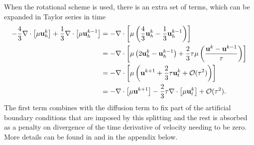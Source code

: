 \documentclass[letterpaper]{erdc}
\begin{document}
\begin{remark}
  When the rotational scheme is used, there is an extra set of terms, which can
  be expanded in Taylor series in time
  \begin{align}
    -\frac{4}{3}\nabla\cdot\left[\mu\textbf{u}_h^{k}\right] + \frac{1}{3}\nabla\cdot\left[\mu\textbf{u}_h^{k-1}\right] &= -\nabla\cdot\left[\mu\left(\frac{4}{3}\textbf{u}_h^{k} - \frac{1}{3}\textbf{u}_h^{k-1} \right)\right]\\
    &= -\nabla\cdot\left[\mu \left(2\textbf{u}_h^{k} - \textbf{u}_h^{k-1}  \right) + \frac{2}{3}\tau\mu\left( \frac{\textbf{u}^{k} - \textbf{u}^{k-1}}{\tau} \right)   \right]\\
    &= -\nabla\cdot\left[\mu\left( \textbf{u}^{k+1} + \frac{2}{3}\tau\textbf{u}_t^{k} + \mathcal{O}(\tau^{2}) \right)\right]\\
    &= -\nabla\cdot\left[\mu\textbf{u}^{k+1}\right] - \frac{2}{3}\tau\nabla\cdot\left[\mu\textbf{u}_t^{k}\right] + \mathcal{O}(\tau^{2}).
  \end{align}
  The first term combines with the diffusion term to fix part of the artificial
  boundary conditions that are imposed by this splitting and the rest is
  absorbed as a penalty on divergence of the time derivative of velocity
  needing to be zero.  More details can be found in \cite{guermond2004error}
  and in the appendix below.
\end{remark}

\end{document}
